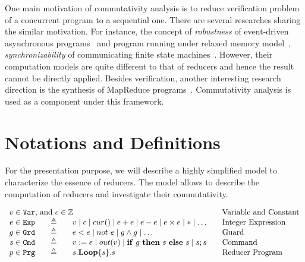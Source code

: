 \documentclass{llncs}
\newcommand{\Var}{\mathtt{Var}}
\newcommand{\Exp}{\mathtt{Exp}}
\newcommand{\Cmd}{\mathtt{Cmd}}
\newcommand{\Grd}{\mathtt{Grd}}
\newcommand{\Prg}{\mathtt{Prg}}
\newcommand{\cur}{cur()}
\newcommand{\ite}[3]{
	 \ifmmode 
	 \mathbf{if}\ #1 \ \mathbf{then}\ #2\  \mathbf{else}\ #3 
	 \else
	 \textbf{if}\ #1 \ \textbf{then}\ #2\  \textbf{else}\ #3
	 \fi}
\newcommand{\rloop}{
	\ifmmode 
	\mathbf{Loop}
	\else
	\textbf{Loop}
	\fi}
\newcommand{\Z}{\mathbb{Z}}
\begin{document}
One main motivation of commutativity analysis is to reduce verification problem of a concurrent program to a sequential one. There are several researches sharing the similar motivation. For instance, the concept of \emph{robustness} of event-driven asynchronous programs~\cite{ahmed2017:robustness}  and program running under relaxed memory model~\cite{ahmed2013:robustness,AbdullaACLR13,AbdullaACLR12}, \emph{synchronizability} of communicating finite state machines~\cite{FinkelL17,basu2012synchronizability,basu2011choreography}. However, their computation models are quite different to that of reducers and hence the result cannot be directly applied. Besides verification, another interesting research direction is the synthesis of MapReduce programs~\cite{SmithA16}. Commutativity analysis is used as a component under this framework.

\section{Notations and Definitions}
\label{section:integer-reducers}
For the presentation purpose, we will describe a highly simplified model to characterize the essence of reducers. The model allows to describe the computation of reducers and investigate their commutativity.

\begin{equation*}
\begin{array}{rclcl}
\multicolumn{3}{l}{v\in \Var\mbox{, and }c \in \Z}&&\textmd{Variable and Constant}\\
e \in \Exp    &\ \ \  {\triangleq}\ \ \   & v \mid c \mid \cur \mid e + e \mid e - e \mid e \times e \mid *\mid\ldots & &\textmd{Integer Expression}\\
g\in \Grd  & {\triangleq}  & e < e \mid not\ e \mid g \wedge g  \mid \ldots& & \textmd{Guard}\\
s\in \Cmd  & {\triangleq}  & v:= e \mid out(v) \mid \ite{g}{s}{s} \mid s;s && \textmd{Command}\\
p\in \Prg  & {\triangleq}  & s.\rloop\{s\}.s&& \textmd{Reducer Program}\\
\end{array}
\end{equation*}
\end{document}
